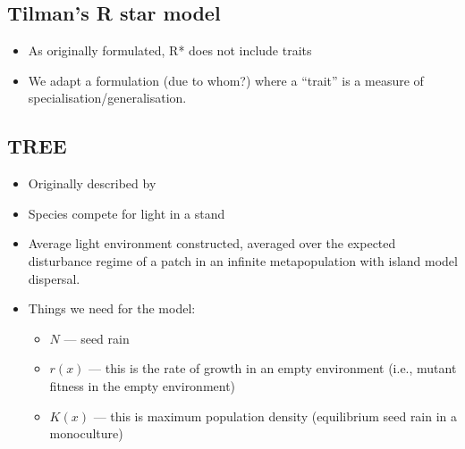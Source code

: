\documentclass[a4paper,11pt]{article}
\begin{document}
\subsection{Tilman's R star model}
\begin{itemize}
\item As originally formulated, R* does not include traits
\item We adapt a formulation (due to whom?) where a ``trait'' is a
  measure of specialisation/generalisation.
\end{itemize}

\subsection{TREE}
\begin{itemize}
\item Originally described by \citet{Falster-2011}
\item Species compete for light in a stand
\item Average light environment constructed, averaged over the
  expected disturbance regime of a patch in an infinite metapopulation
  with island model dispersal.
\item Things we need for the model:
  \begin{itemize}
  \item $N$ --- seed rain
  \item $r(x)$ --- this is the rate of growth in an empty environment
    (i.e., mutant fitness in the empty environment)
  \item $K(x)$ --- this is maximum population density (equilibrium
    seed rain in a monoculture)
  \end{itemize}
\end{itemize}



\end{document}
